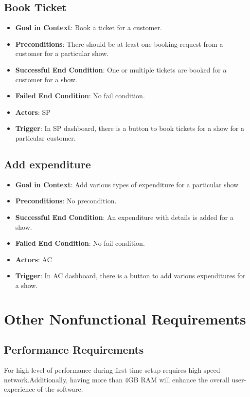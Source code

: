 \documentclass{scrreprt}
\begin{document}
\section{Book Ticket}
\begin{itemize}
\item \textbf{Goal in Context}: Book a ticket for a customer.
\item \textbf{Preconditions}: There should be at least one booking request from a customer for a particular show. 
\item \textbf{Successful End Condition}: One or multiple tickets are booked for a customer for a show.
\item \textbf{Failed End Condition}: No fail condition.
\item \textbf{Actors}: SP
\item \textbf{Trigger}: In SP dashboard, there is a button to book tickets for a show for a particular customer.
\end{itemize}


\section{Add expenditure}
\begin{itemize}
\item \textbf{Goal in Context}: Add various types of expenditure for a particular show
\item \textbf{Preconditions}: No precondition. 
\item \textbf{Successful End Condition}: An expenditure with details is added for a show.
\item \textbf{Failed End Condition}: No fail condition.
\item \textbf{Actors}: AC
\item \textbf{Trigger}: In AC dashboard, there is a button to add various expenditures for a show.
\end{itemize}



\chapter{Other Nonfunctional Requirements}

\section{Performance Requirements}

For high level of performance during first time setup requires high speed network.Additionally, having more than 4GB RAM will enhance the overall user-experience of the software.
\end{document}
